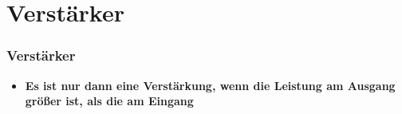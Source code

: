 \section{Verstärker}
\begin{frame}
\frametitle{Verstärker}
\begin{center}
\begin{Large}
\begin{itemize}
	\item \textbf{Es ist nur dann eine Verstärkung, wenn die Leistung am Ausgang größer ist, als die am Eingang}

\end{itemize}
\end{Large}
\end{center}
\end{frame}

